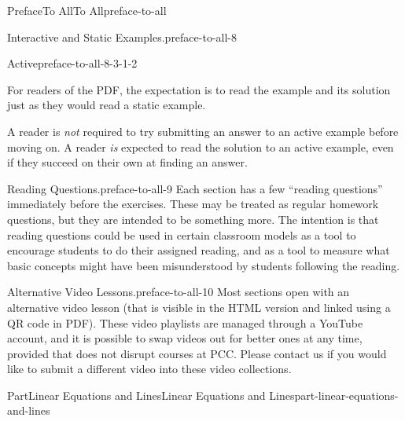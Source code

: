 \documentclass[twoside,10pt,]{book}
\numberwithin{equation}{section}
\begin{document}
\begin{preface}{Preface}{To All}{}{To All}{}{}{preface-to-all}
\begin{paragraphs}{Interactive and Static Examples.}{preface-to-all-8}
\begin{descriptionlist}
\begin{dlinarrow}{Active}{preface-to-all-8-3-1-2}
\par
For readers of the PDF, the expectation is to read the example and its solution just as they would read a static example.%
\par
A reader is \emph{not} required to try submitting an answer to an active example before moving on. A reader \emph{is} expected to read the solution to an active example, even if they succeed on their own at finding an answer.%
\end{dlinarrow}%
\end{descriptionlist}
%
\end{paragraphs}%
\begin{paragraphs}{Reading Questions.}{preface-to-all-9}%
Each section has a few ``reading questions'' immediately before the exercises. These may be treated as regular homework questions, but they are intended to be something more. The intention is that reading questions could be used in certain classroom models as a tool to encourage students to do their assigned reading, and as a tool to measure what basic concepts might have been misunderstood by students following the reading.%
\end{paragraphs}%
\begin{paragraphs}{Alternative Video Lessons.}{preface-to-all-10}%
Most sections open with an alternative video lesson (that is visible in the HTML version and linked using a QR code in PDF). These video playlists are managed through a YouTube account, and it is possible to swap videos out for better ones at any time, provided that does not disrupt courses at PCC. Please contact us if you would like to submit a different video into these video collections.%
\end{paragraphs}%
\end{preface}
\setcounter{tocdepth}{1}
\renewcommand*\contentsname{Contents}
\tableofcontents
\mainmatter
%
%
\typeout{************************************************}
\typeout{************************************************}
%
\begin{partptx}{Part}{Linear Equations and Lines}{}{Linear Equations and Lines}{}{}{part-linear-equations-and-lines}
\renewcommand*{\partname}{Part}
    \end{partptx}
%
%
\typeout{************************************************}
\typeout{************************************************}
%
\end{document}
